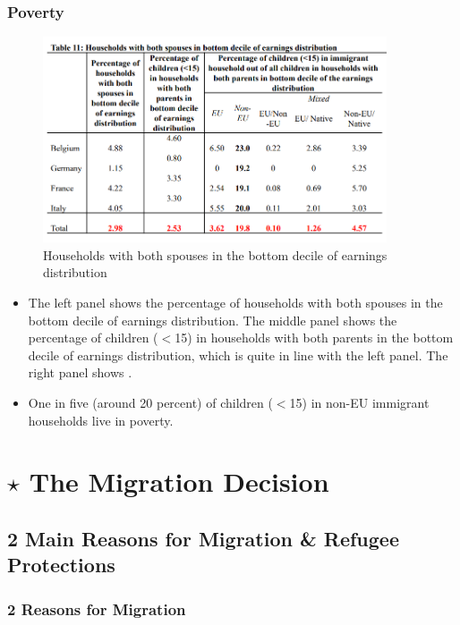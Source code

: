         \subsubsection{Poverty}

            \begin{figure}[H]
                \centering
                \includegraphics[width=4in]{images/ch11/11.png}
                \caption{Households with both spouses in the bottom decile of earnings distribution}
            \end{figure}
            \begin{itemize}
                \item The left panel shows the percentage of households with both spouses in the bottom decile of earnings distribution. The middle panel shows the percentage of children ($<$15) in households with both parents in the bottom decile of earnings distribution, which is quite in line with the left panel. The right panel shows .      
                \item One in five (around 20 percent) of children ($<$15) in non-EU immigrant households live in poverty.
            \end{itemize}
            

\section{$\star$ The Migration Decision}

    \subsection{2 Main Reasons for Migration \& Refugee Protections}

        \subsubsection{2 Reasons for Migration}


